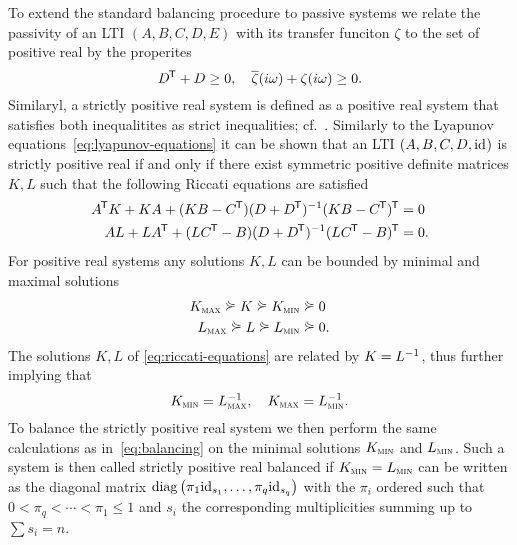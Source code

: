 To extend the standard balancing procedure to passive systems we relate the passivity of an LTI $(A, B, C, D, E)$ with its transfer funciton $\zeta$ to the set of positive real by the properites
\begin{equation*}
    D\trans + D \geq 0,\quad \overline{\zeta}(i \omega) + \zeta(i \omega) \geq 0.
\end{equation*}
Similaryl, a strictly positive real system is defined as a positive real system that satisfies both inequalitites as strict inequalities; cf.~\cite[Section~5]{Gugercin2007}.
Similarly to the Lyapunov equations~\eqref{eq:lyapunov-equations} it can be shown that an LTI $(A, B, C, D, \id)$ is strictly positive real if and only if there exist symmetric positive definite matrices $K, L$ such that the following Riccati equations are satisfied
\begin{equation}\label{eq:riccati-equations}
    \begin{aligned}
        A\trans K + K A + (K B - C\trans) (D + D\trans)\inv (K B - C\trans)\trans &= 0 \\
        A L + L A\trans + (L C\trans - B) (D + D\trans)\inv (L C\trans - B)\trans &= 0.
    \end{aligned}
\end{equation}
For positive real systems any solutions $K, L$ can be bounded by minimal and maximal solutions
\begin{align*}
    K_{\textsc{max}} \curlyeqsucc K \curlyeqsucc K_{\textsc{min}} &\curlyeqsucc 0 \\
    L_{\textsc{max}} \curlyeqsucc L \curlyeqsucc L_{\textsc{min}} &\curlyeqsucc 0.
\end{align*}
The solutions $K, L$ of \eqref{eq:riccati-equations} are related by $K = L\inv$, thus further implying that
\begin{equation*}
    K_{\textsc{min}} = L_{\textsc{max}}\inv,\quad K_{\textsc{max}} = L_{\textsc{min}}\inv.
\end{equation*}
To balance the strictly positive real system we then perform the same calculations as in~\eqref{eq:balancing} on the minimal solutions $K_{\textsc{min}}$ and $L_{\textsc{min}}$.
Such a system is then called strictly positive real balanced if $K_{\textsc{min}} = L_{\textsc{min}}$ can be written as the diagonal matrix $\diag{\pi_1 \id[s_1], \dots, \pi_q \id[s_q]}$ with the $\pi_i$ ordered such that $0 < \pi_q < \cdots < \pi_1 \leq 1$ and $s_i$ the corresponding multiplicities summing up to $\sum s_i = n$.


